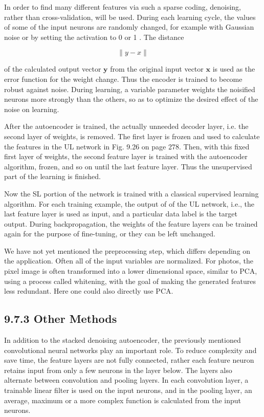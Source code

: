 \documentclass[10pt]{book}
\begin{document}
\begin{center}
\begin{enumerate}
\begin{center}
\begin{center}
\begin{center}
In order to find many different features via such a sparse coding, denoising, rather than cross-validation, will be used. During each learning cycle, the values of some of the input neurons are randomly changed, for example with Gaussian noise or by setting the activation to 0 or 1 . The distance


$$
\|y-x\|
$$

of the calculated output vector $\boldsymbol{y}$ from the original input vector $\boldsymbol{x}$ is used as the error function for the weight change. Thus the encoder is trained to become robust against noise. During learning, a variable parameter weights the noisified neurons more strongly than the others, so as to optimize the desired effect of the noise on learning.

After the autoencoder is trained, the actually unneeded decoder layer, i.e. the second layer of weights, is removed. The first layer is frozen and used to calculate the features in the UL network in Fig. 9.26 on page 278. Then, with this fixed first layer of weights, the second feature layer is trained with the autoencoder algorithm, frozen, and so on until the last feature layer. Thus the unsupervised part of the learning is finished.

Now the SL portion of the network is trained with a classical supervised learning algorithm. For each training example, the output of of the UL network, i.e., the last feature layer is used as input, and a particular data label is the target output. During backpropagation, the weights of the feature layers can be trained again for the purpose of fine-tuning, or they can be left unchanged.

We have not yet mentioned the preprocessing step, which differs depending on the application. Often all of the input variables are normalized. For photos, the pixel image is often transformed into a lower dimensional space, similar to PCA, using a process called whitening, with the goal of making the generated features less redundant. Here one could also directly use PCA.

\subsection*{9.7.3 Other Methods}
In addition to the stacked denoising autoencoder, the previously mentioned convolutional neural networks play an important role. To reduce complexity and save time, the feature layers are not fully connected, rather each feature neuron retains input from only a few neurons in the layer below. The layers also alternate between convolution and pooling layers. In each convolution layer, a trainable linear filter is used on the input neurons, and in the pooling layer, an average, maximum or a more complex function is calculated from the input neurons.


\end{center}
\end{center}
\end{center}
\end{enumerate}
\end{center}
\end{document}
